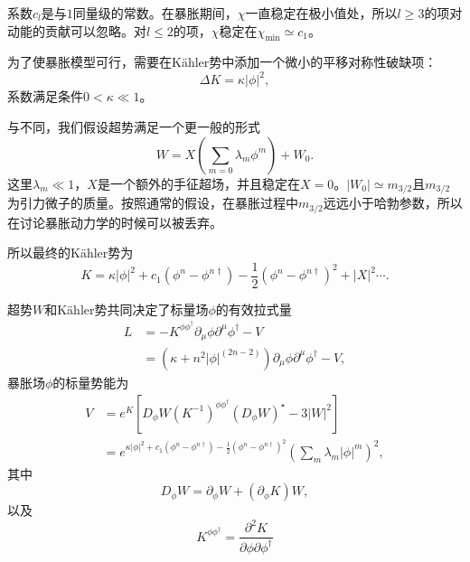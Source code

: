 系数$c_l$是与$1$同量级的常数。在暴胀期间，$\chi$一直稳定在极小值处，所以$l\ge
3$的项对动能的贡献可以忽略\citep{takahashi2010linear}。对$l\le2$的项，$\chi$稳定在$\chi_{\text{min}}\simeq
c_1$。

为了使暴胀模型可行，需要在K\"ahler势中添加一个微小的平移对称性破缺项：
\begin{equation}
    \Delta{K} = \kappa \left|\phi\right|^2,
\end{equation}
系数满足条件$0< \kappa \ll 1$。

与\citep{nakayama2010running}不同，我们假设超势满足一个更一般的形式\citep{nakayama2013polynomial,kawasaki2000natural,kawasaki2001natural,kallosh2010new,kallosh2011general}
\begin{equation}
    W = X\left(\sum_{m=0}\lambda_m\phi^m\right)+W_0.
\end{equation}
这里$\lambda_m\ll
1$，$X$是一个额外的手征超场，并且稳定在$X=0$。$\left|W_0\right|\simeq
m_{3/2}$且$m_{3/2}$为引力微子的质量。按照通常的假设，在暴胀过程中$m_{3/2}$远远小于哈勃参数，所以在讨论暴胀动力学的时候可以被丢弃。

所以最终的K\"ahler势为
\begin{equation}
    K = \kappa |\phi|^2 + c_1(\phi^n-\phi^{n\dagger}) -
    \frac{1}{2}{(\phi^n-\phi^{n\dagger})}^2 + |X|^2\cdots.
\end{equation}

超势$W$和K\"ahler势共同决定了标量场$\phi$的有效拉式量
\begin{equation}
\begin{split}\label{eq:lagrangian}
L &= -K^{\phi\phi^\dagger} \partial_\mu\phi\partial^\mu\phi^\dagger
- V \\
  & = (\kappa + n^2|\phi|^{(2n-2)})
  \partial_\mu \phi \partial^\mu \phi^\dagger - V,
\end{split}
\end{equation}
暴胀场$\phi$的标量势能为
\begin{equation}
\begin{split}
V &= e^K \left[
    D_\phi W{(K^{-1})}^{\phi\phi^\dagger}{(D_\phi W)}^{\star} - 3|W|^2 
    \right]\\
  &=
  e^{\kappa|\phi|^2+c_1(\phi^n-\phi^{n\dagger})-\frac{1}{2}{(\phi^n-\phi^{n\dagger})}^2}{(\sum_m
  \lambda_m|\phi|^m)}^2,
\end{split}
\end{equation}
其中
\begin{equation}
    D_\phi W = \partial_\phi W + (\partial_\phi K) W,
\end{equation}
以及
\begin{equation}
    K^{\phi\phi^\dagger} = \frac{\partial^2 K}{\partial\phi
    \partial\phi^\dagger}
\end{equation}

